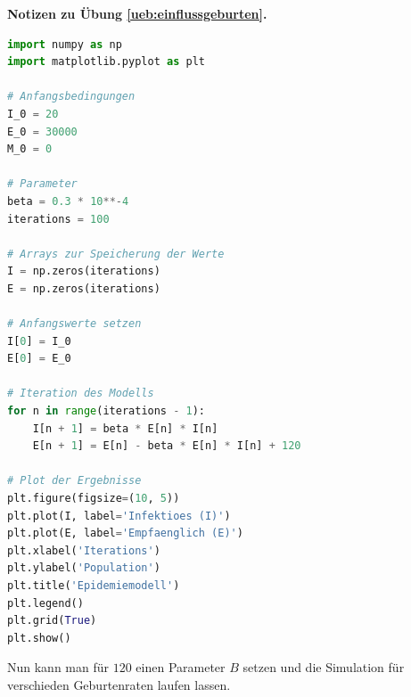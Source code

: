 \documentclass[%
11pt,%
twoside,%
titlepage,%
german,%
headsepline%
]{scrartcl}
\newcommand{\concatueb}[1]{ueb:#1}%
\newcommand{\concatlsg}[1]{lsg:#1}%
\newenvironment{lsg}[1]{%
    \par\noindent\textbf{Notizen zu Übung \ref{\concatueb{#1}}.}%
    \label{\concatlsg{#1}}
}{%
    \par%
}
\begin{document}
\begin{lsg}{einflussgeburten}
    \begin{lstlisting}[language=python]
import numpy as np
import matplotlib.pyplot as plt

# Anfangsbedingungen
I_0 = 20
E_0 = 30000
M_0 = 0

# Parameter
beta = 0.3 * 10**-4
iterations = 100

# Arrays zur Speicherung der Werte
I = np.zeros(iterations)
E = np.zeros(iterations)

# Anfangswerte setzen
I[0] = I_0
E[0] = E_0

# Iteration des Modells
for n in range(iterations - 1):
    I[n + 1] = beta * E[n] * I[n]
    E[n + 1] = E[n] - beta * E[n] * I[n] + 120

# Plot der Ergebnisse
plt.figure(figsize=(10, 5))
plt.plot(I, label='Infektioes (I)')
plt.plot(E, label='Empfaenglich (E)')
plt.xlabel('Iterations')
plt.ylabel('Population')
plt.title('Epidemiemodell')
plt.legend()
plt.grid(True)
plt.show()
    \end{lstlisting}

    Nun kann man für $120$ einen Parameter $B$ setzen und die Simulation für verschieden Geburtenraten laufen lassen.
    

\end{lsg}
\end{document}
